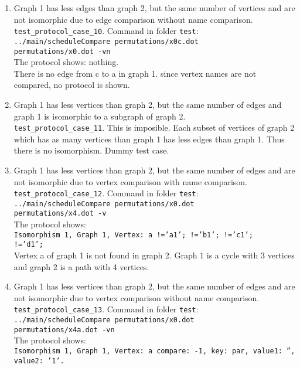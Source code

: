 \documentclass[12pt,a4paper]{report}
\begin{document}
\begin{enumerate}
  \item Graph 1 has less edges than graph 2, but the same number of vertices and are not isomorphic due to edge comparison without name comparison.
    \texttt{test\_protocol\_case\_10}. Command in folder \texttt{test}: \\
    \texttt{../main/scheduleCompare permutations/x0c.dot \\ permutations/x0.dot -vn} \\
    The protocol shows: nothing. \\
    There is no edge from c to a in graph 1. since vertex names are not compared, no protocol is shown.

  \item Graph 1 has less vertices than graph 2, but the same number of edges and graph 1 is isomorphic to a subgraph of graph 2. \\
    \texttt{test\_protocol\_case\_11}. 
    This is imposible. Each subset of vertices of graph 2 which has as many vertices than graph 1 has less edges than graph 1.
    Thus there is no isomorphism.
    Dummy test case.
  \item Graph 1 has less vertices than graph 2, but the same number of edges and are not isomorphic due to vertex comparison with name comparison.
    \texttt{test\_protocol\_case\_12}. Command in folder \texttt{test}: \\
    \texttt{../main/scheduleCompare permutations/x0.dot \\ permutations/x4.dot -v} \\
    The protocol shows: \\
    \texttt{Isomorphism 1, Graph 1, Vertex: a !='a1'; !='b1'; !='c1'; \\ !='d1';} \\
    Vertex a of graph 1 is not found in graph 2.
    Graph 1 is a cycle with 3 vertices and graph 2 is a path with 4 vertices.
  \item Graph 1 has less vertices than graph 2, but the same number of edges and are not isomorphic due to vertex comparison without name comparison.
    \texttt{test\_protocol\_case\_13}. Command in folder \texttt{test}: \\
    \texttt{../main/scheduleCompare permutations/x0.dot \\ permutations/x4a.dot -vn} \\
    The protocol shows: \\
    \texttt{Isomorphism 1, Graph 1, Vertex: a compare: -1, key: par, value1: '', value2: '1'. \\
}
\end{enumerate}
\end{document}
